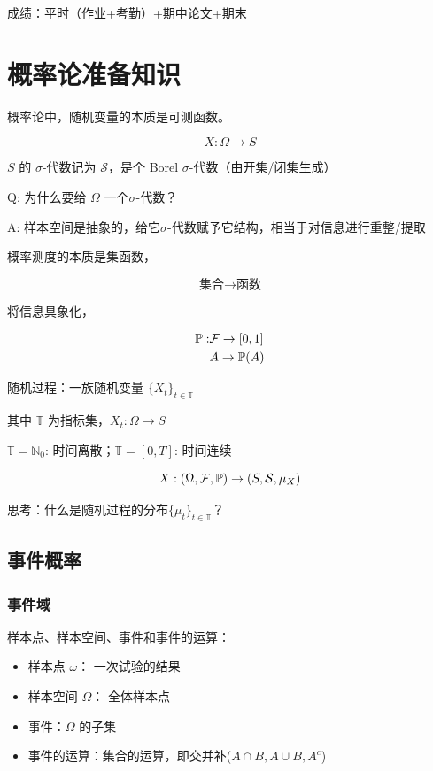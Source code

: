 成绩：平时（作业+考勤）+期中论文+期末

\section*{概率论准备知识}

概率论中，随机变量的本质是可测函数。

\[
X:\Omega\rightarrow S
\]

$S$ 的 $\sigma$-代数记为 $\mathcal{S}$，是个 Borel $\sigma$-代数（由开集/闭集生成）

Q: 为什么要给 $\Omega$ 一个$\sigma$-代数？

A: 样本空间是抽象的，给它$\sigma$-代数赋予它结构，相当于对信息进行重整/提取

概率测度的本质是集函数，

\[
\text{集合}\rightarrow \text{函数}
\]

将信息具象化，

\[
\begin{aligned}
    \mathbb{P}: &\mathcal{F}\rightarrow [0,1]\\
    &A\rightarrow \mathbb{P}(A)
\end{aligned}
\]

随机过程：一族随机变量 $\{X_t\}_{t\in \mathbb{T}}$

其中 $\mathbb{T}$ 为指标集，$X_t:\Omega\rightarrow S$

\begin{example}
$\mathbb{T}=\mathbb{N}_0$: 时间离散；$\mathbb{T}=[0,T]$: 时间连续 
\end{example}

\[
X:(\Omega, \mathcal{F}, \mathbb{P})\rightarrow (S,\mathcal{S}, \mu_X)
\]

思考：什么是随机过程的分布$\{\mu_t\}_{t\in \mathbb{T}}$？

\newpage

\subsection{事件概率}

\subsubsection{事件域}

\begin{definition}[样本空间、事件]
    样本点、样本空间、事件和事件的运算：
    \begin{itemize}
        \item 样本点 $\omega$： 一次试验的结果
        \item 样本空间 $\Omega$： 全体样本点
        \item 事件：$\Omega$ 的子集
        \item 事件的运算：集合的运算，即交并补($A\cap B, A\cup B, A^c$)
    \end{itemize}
\end{definition}

